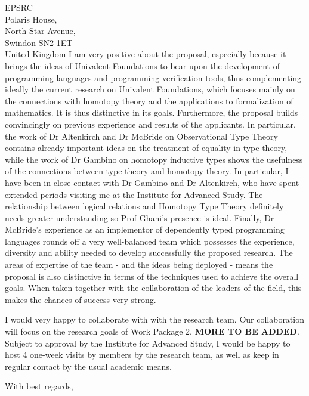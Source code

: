 \documentclass[10pt,a4paper,oneside]{letter}
\begin{document}
\begin{letter}{
EPSRC \\
Polaris House, \\
North Star Avenue, \\
Swindon SN2 1ET\\
United Kingdom}
I am very positive about the proposal, especially because it brings
the ideas of Univalent Foundations to bear upon the development of
programming languages and programming verification tools, thus
complementing ideally the current research on Univalent Foundations,
which focuses mainly on the connections with homotopy theory and the
applications to formalization of mathematics.  It is thus distinctive
in its goals. Furthermore, the proposal builds convincingly on
previous experience and results of the applicants. In particular, the
work of Dr Altenkirch and Dr McBride on Observational Type Theory
contains already important ideas on the treatment of equality in type
theory, while the work of Dr Gambino on homotopy inductive types shows
the usefulness of the connections between type theory and homotopy
theory. In particular, I have been in close contact with Dr Gambino
and Dr Altenkirch, who have spent extended periods visiting me at the
Institute for Advanced Study.  The relationship between logical
relations and Homotopy Type Theory definitely needs greater
understanding so Prof Ghani's presence is ideal. Finally, Dr McBride's
experience as an implementor of dependently typed programming
languages rounds off a very well-balanced team which possesses the
experience, diversity and ability needed to develop successfully the
proposed research. The areas of expertise of the team - and the ideas
being deployed - means the proposal is also distinctive in terms of
the techniques used to achieve the overall goals. When taken together
with the collaboration of the leaders of the field, this makes the
chances of success very strong.





 I would very happy to collaborate with with the
research team.  Our collaboration will focus on the
research goals of Work Package 2. {\bf MORE TO BE ADDED}.
Subject to approval by the Institute for Advanced Study, I would be happy
to host 4 one-week visits by members by the research team, as well as
keep in regular contact by the usual academic means.





\closing{With best regards,}

\end{letter}
\end{document}
